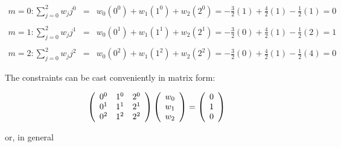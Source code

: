 \documentclass[12pt]{article}
\begin{document}
\begin{eqnarray*}
m = 0: \sum_{j = 0}^2 w_j j^0 & = & w_0(0^0) + w_1(1^0) + w_2(2^0) = -\tfrac{3}{2}(1) + \tfrac{4}{2}(1) - \tfrac{1}{2}(1) = 0 \\
&& \\[1em]
m = 1: \sum_{j = 0}^2 w_j j^1 & = & w_0(0^1) + w_1(1^1) + w_2(2^1) = -\tfrac{3}{2}(0) + \tfrac{4}{2}(1) - \tfrac{1}{2}(2) = 1 \\
&& \\[1em]
m = 2: \sum_{j = 0}^2 w_j j^2 & = & w_0(0^2) + w_1(1^2) + w_2(2^2) = -\tfrac{3}{2}(0) + \tfrac{4}{2}(1) - \tfrac{1}{2}(4) = 0
\end{eqnarray*}

The constraints can be cast conveniently in matrix form:

$$\left(\begin{array}{c c c}
0^0 & 1^0 & 2^0 \\
0^1 & 1^1 & 2^1 \\
0^2 & 1^2 & 2^2 \\
\end{array} \right)
\left( \begin{array}{c}
w_0 \\
w_1 \\
w_2
\end{array} \right)
= \left(\begin{array}{c}
0 \\
1 \\
0
\end{array} \right)$$

or, in general
\end{document}
